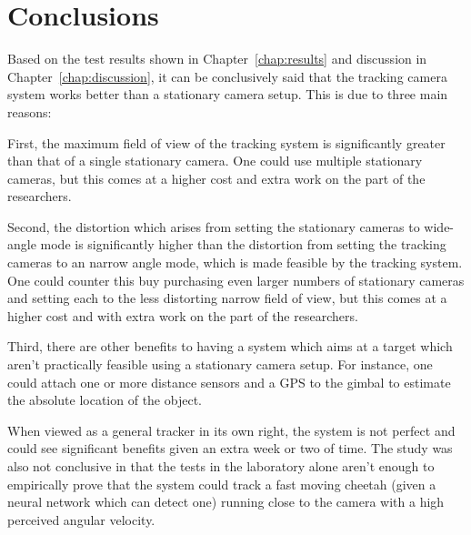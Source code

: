 \chapter{Conclusions}

Based on the test results shown in Chapter~\ref{chap:results} and discussion in Chapter~\ref{chap:discussion}, it can be conclusively said that the tracking camera system works better than a stationary camera setup. This is due to three main reasons:

First, the maximum field of view of the tracking system is significantly greater than that of a single stationary camera. One could use multiple stationary cameras, but this comes at a higher cost and extra work on the part of the researchers.

Second, the distortion which arises from setting the stationary cameras to wide-angle mode is significantly higher than the distortion from setting the tracking cameras to an narrow angle mode, which is made feasible by the tracking system. One could counter this buy purchasing even larger numbers of stationary cameras and setting each to the less distorting narrow field of view, but this comes at a higher cost and with extra work on the part of the researchers.

Third, there are other benefits to having a system which aims at a target which aren't practically feasible using a stationary camera setup. For instance, one could attach one or more distance sensors and a GPS to the gimbal to estimate the absolute location of the object.

When viewed as a general tracker in its own right, the system is not perfect and could see significant benefits given an extra week or two of time. The study was also not conclusive in that the tests in the laboratory alone aren't enough to empirically prove that the system could track a fast moving cheetah (given a neural network which can detect one) running close to the camera with a high perceived angular velocity.
